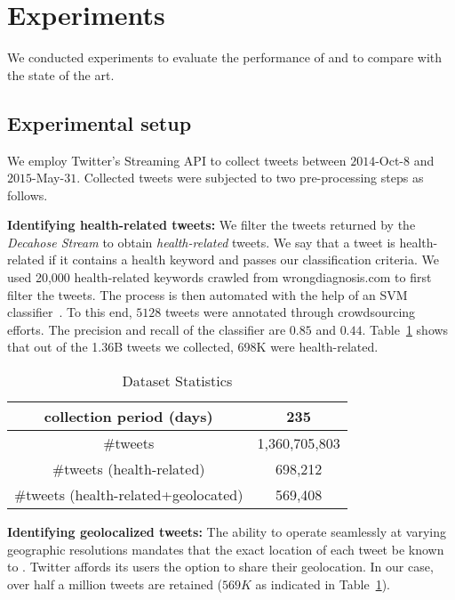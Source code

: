 \section{Experiments}
\label{sec:results}
We conducted experiments to evaluate the performance of \tmatam  and to compare with the state of the art. 
\subsection{Experimental setup}
\label{subsec:setup}
We employ Twitter's Streaming API to collect tweets between $2014$-Oct-$8$ and $2015$-May-$31$. Collected tweets were subjected to two pre-processing steps as follows.


{\bf Identifying health-related tweets:} We filter the tweets 
returned by the \emph{Decahose Stream} to obtain \emph{health-related} 
tweets. We say that a tweet is health-related if it contains a health 
keyword and passes our classification criteria.  We used 20,000 health-related keywords crawled from
wrongdiagnosis.com to first filter the tweets.
The process is then automated with the help of an SVM classifier~\cite{DBLP:journals/ml/CortesV95}. To this end, $5128$ tweets were 
 annotated through crowdsourcing efforts. The precision and recall of the 
 classifier are $0.85$ and $0.44$. Table~\ref{tab:data:stats} 
shows that out of the 1.36B tweets we collected, 698K were health-related.
\begin{table}[t!]
\centering
\caption{Dataset Statistics}
\label{tab:data:stats}
{\small \begin{tabular}{|c|c|}
\hline
collection period (days) & 235\\
\hline
\#tweets & {1,360,705,803}\\
\hline
\#tweets (health-related) & 698,212\\
\hline
\#tweets (health-related+geolocated) & 569,408\\
\hline
\end{tabular}
}
\end{table}

{\bf Identifying geolocalized tweets:} The ability to operate
seamlessly at varying geographic resolutions mandates that the exact
location of each tweet be known to \tmatam. Twitter affords its users
the option to share their geolocation. In our
case, over half a million tweets are retained ($569K$ as indicated in
Table~\ref{tab:data:stats}).

